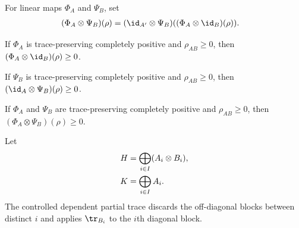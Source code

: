 \begin{definition}
    \label{def:tensor_map_both}
    \leanok
    For linear maps $\Phi_A$ and $\Psi_B$, set
    \begin{align}
        (\Phi_A\otimes\Psi_B)(\rho)
         & =(\id_{A'}\otimes\Psi_B)
        ((\Phi_A\otimes\id_B)(\rho)).
        \notag
    \end{align}
\end{definition}

\begin{lemma}
    \label{lem:tensor_map_id_pos}
    \leanok
    If $\Phi_A$ is trace-preserving completely positive and
    $\rho_{AB}\geq0$, then
    $(\Phi_A\otimes\id_B)(\rho)\geq0$.
\end{lemma}

\begin{lemma}
    \label{lem:id_tensor_map_pos}
    \leanok
    If $\Psi_B$ is trace-preserving completely positive and
    $\rho_{AB}\geq0$, then
    $(\id_A\otimes\Psi_B)(\rho)\geq0$.
\end{lemma}

\begin{lemma}
    \label{lem:tensor_map_both_pos}
    \leanok
    If $\Phi_A$ and $\Psi_B$ are trace-preserving completely positive and
    $\rho_{AB}\geq0$, then $(\Phi_A\otimes\Psi_B)(\rho)\geq0$.
\end{lemma}
\begin{definition}
    \label{def:controlled_dependent_partial_trace}
    \leanok

    Let
    \begin{align}
        H & =\bigoplus_{i\in I}(A_i\otimes B_i), \notag \\
        K & =\bigoplus_{i\in I}A_i. \notag
    \end{align}
    The controlled dependent partial trace discards the off-diagonal blocks
    between distinct $i$ and applies $\tr_{B_i}$ to the $i$th diagonal block.
\end{definition}

